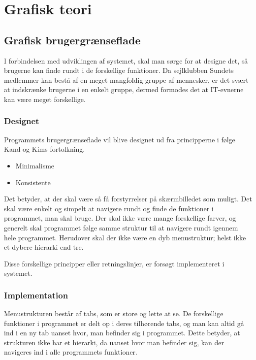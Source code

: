 \chapter{Grafisk teori}
\section{Grafisk brugergrænseflade} \label{chap:GUI}

I forbindelsen med udviklingen af systemet, skal man sørge for at designe det, så brugerne kan finde rundt i de forskellige funktioner. 
Da sejlklubben Sundets medlemmer kan bestå af en meget mangfoldig gruppe af mennesker, er det svært at indskrænke brugerne i en enkelt gruppe, dermed formodes det at IT-evnerne kan være meget forskellige.


\subsection{Designet} \label{sec:Designet}

Programmets brugergrænseflade vil blive designet ud fra principperne i følge Kand og Kims fortolkning. \citep{gui1} 

\begin{itemize}
	\item Minimalisme
	\item Konsistente
\end{itemize}

Det betyder, at der skal være så få forstyrrelser på skærmbilledet som muligt. 
Det skal være enkelt og simpelt at navigere rundt og finde de funktioner i programmet, man skal bruge. 
Der skal ikke være mange forskellige farver, og generelt skal programmet følge samme struktur til at navigere rundt igennem hele programmet. 
Herudover skal der ikke være en dyb menustruktur; helst ikke et dybere hierarki end tre.

Disse forskellige principper eller retningslinjer, er forsøgt implementeret i systemet.

\subsection{Implementation}\label{sec:Implementation}

Menustrukturen består af tabs, som er store og lette at se.
De forskellige funktioner i programmet er delt op i deres tilhørende tabs, og man kan altid gå ind i en ny tab uanset hvor, man befinder sig i programmet. 
Dette betyder, at strukturen ikke har et hierarki, da uanset hvor man befinder sig, kan der navigeres ind i alle programmets funktioner. 

